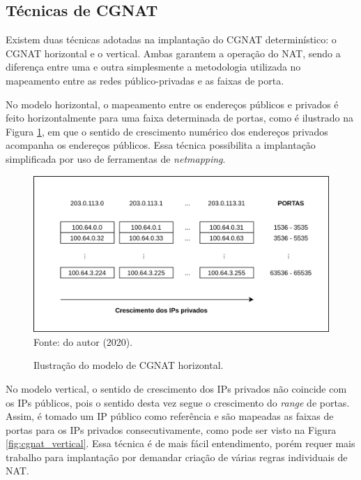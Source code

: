 \subsection{Técnicas de CGNAT}

    Existem duas técnicas adotadas na implantação do CGNAT determinístico: o CGNAT horizontal e o vertical. Ambas garantem a operação do NAT, sendo a diferença entre uma e outra simplesmente a metodologia utilizada no mapeamento entre as redes público-privadas e as faixas de porta.
    
    No modelo horizontal, o mapeamento entre os endereços públicos e privados é feito horizontalmente para uma faixa determinada de portas, como é ilustrado na Figura \ref{fig:cgnat_horizontal}, em que o sentido de crescimento numérico dos endereços privados acompanha os endereços públicos. Essa técnica possibilita a implantação simplificada por uso de ferramentas de \textit{netmapping}.
    
    \begin{figure}[!htb]
        \centering
        \caption{Ilustração do modelo de CGNAT horizontal.} 
        \label{fig:cgnat_horizontal} 
        \includegraphics[width=0.9\linewidth]{img/CGNAT-Horizontal.png} \\
        {\small Fonte: do autor (2020).} 
    \end{figure}
    
    No modelo vertical, o sentido de crescimento dos IPs privados não coincide com os IPs públicos, pois o sentido desta vez segue o crescimento do \textit{range} de portas. Assim, é tomado um IP público como referência e são mapeadas as faixas de portas para os IPs privados consecutivamente, como pode ser visto na Figura \ref{fig:cgnat_vertical}. Essa técnica é de mais fácil entendimento, porém requer mais trabalho para implantação por demandar criação de várias regras individuais de NAT.
    
